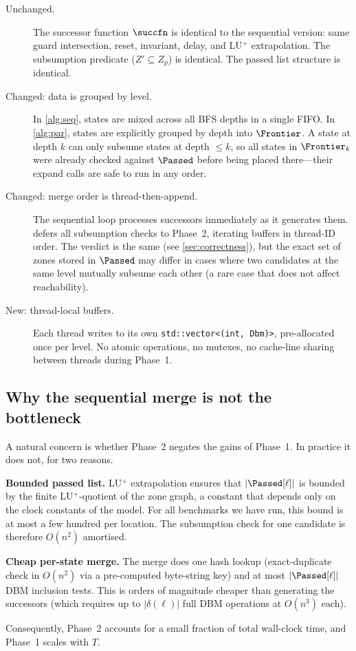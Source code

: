 \begin{description}
  \item[Unchanged.] The successor function $\succfn$ is identical to the
    sequential version: same guard intersection, reset, invariant, delay, and
    LU$^+$ extrapolation.  The subsumption predicate ($Z' \subseteq Z_p$) is
    identical.  The passed list structure is identical.

  \item[Changed: data is grouped by level.]  In \cref{alg:seq}, states are
    mixed across all BFS depths in a single FIFO.  In \cref{alg:par}, states
    are explicitly grouped by depth into $\Frontier$.  A state at depth $k$
    can only subsume states at depth $\leq k$, so all states in $\Frontier_k$
    were already checked against $\Passed$ before being placed there---their
    expand calls are safe to run in any order.

  \item[Changed: merge order is thread-then-append.]  The sequential loop
    processes successors immediately as it generates them.  
    defers all subsumption checks to Phase~2, iterating buffers in thread-ID
    order.  The verdict is the same (see \cref{sec:correctness}), but the
    exact set of zones stored in $\Passed$ may differ in cases where two
    candidates at the same level mutually subsume each other (a rare case
    that does not affect reachability).

  \item[New: thread-local buffers.]  Each thread writes to its own
    \texttt{std::vector<(int,\,Dbm)>}, pre-allocated once per level.  No
    atomic operations, no mutexes, no cache-line sharing between threads
    during Phase~1.
\end{description}

\subsection{Why the sequential merge is not the bottleneck}

A natural concern is whether Phase~2 negates the gains of Phase~1.  In
practice it does not, for two reasons.

\textbf{Bounded passed list.}  LU$^+$ extrapolation ensures that
$|\Passed[\ell]|$ is bounded by the finite LU$^+$-quotient of the zone graph,
a constant that depends only on the clock constants of the model.  For all
benchmarks we have run, this bound is at most a few hundred per location.
The subsumption check for one candidate is therefore $O(n^2)$ amortised.

\textbf{Cheap per-state merge.}  The merge does one hash lookup
(exact-duplicate check in $O(n^2)$ via a pre-computed byte-string key) and at
most $|\Passed[\ell]|$ DBM inclusion tests.  This is orders of magnitude
cheaper than generating the successors (which requires up to $|\delta(\ell)|$
full DBM operations at $O(n^3)$ each).

Consequently, Phase~2 accounts for a small fraction of total wall-clock time,
and Phase~1 scales with $T$.
